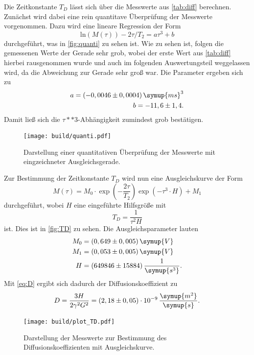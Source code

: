 Die Zeitkonstante $T_D$ lässt sich über die Messwerte aus \autoref{tab:diff} berechnen.
Zunächst wird dabei eine rein quantitave Überprüfung der Messwerte vorgenommen.
Dazu wird eine lineare Regression der Form 
\begin{equation*}
     \text{ln}(M(\tau)) - 2\tau /T_2 = a \tau^3 + b
\end{equation*}     
durchgeführt,
was in \autoref{fig:quanti} zu sehen ist.
Wie zu sehen ist, folgen die gemessenen Werte der Gerade sehr grob, wobei der erste Wert aus \autoref{tab:diff}
hierbei rausgenommen wurde und auch im folgenden Auswertungsteil weggelassen wird, da die Abweichung zur Gerade 
sehr groß war.
Die Parameter ergeben sich zu 
\begin{align*}
    a = (-0,0046 \pm 0,0004) \, \symup{ms}^3 \\
    b = -11,6 \pm 1,4.
\end{align*}
Damit ließ sich die $\tau**3$-Abhängigkeit zumindest grob bestätigen.\\
\begin{figure}
    \centering
    \texttt{[image: build/quanti.pdf]}
    \caption{Darstellung einer quantitativen Überprüfung der Messwerte mit eingzeichneter Ausgleichsgerade.}
    \label{fig:quanti}
\end{figure}
Zur Bestimmung der Zeitkonstante $T_D$ wird nun eine Ausgleichskurve der Form 
\begin{equation*}
    M(\tau) = M_0 \cdot \exp \left( - \frac{2 \tau}{T_2}  \right) \exp \left( - \tau^3 \cdot H   \right) + M_1
\end{equation*}
durchgeführt, wobei $H$ eine eingeführte Hilfsgröße mit 
\begin{equation*}
    T_D = \frac{1}{\tau^2 H}
\end{equation*}
ist. Dies ist in \autoref{fig:TD} zu sehen.
Die Ausgleichsparameter lauten
\begin{align*}
    M_0 &= (0,649 \pm 0,005) \, \symup{V} \\
    M_1 &= (0,053 \pm 0,005) \, \symup{V} \\
    H   &= (649846 \pm 15884) \, \frac{1}{\symup{s^3}}.
\end{align*}
Mit \autoref{eq:D} ergibt sich dadurch der Diffusionskoeffizient zu
\begin{equation*}
    D = \frac{3 H}{2 \gamma^2 G^2} = (2,18 \pm 0,05 ) \cdot 10^{-9} \, \frac{\symup{m^2}}{\symup{s}}.
\end{equation*}
\begin{figure}
    \centering
    \texttt{[image: build/plot\_TD.pdf]}
    \caption{Darstellung der Messwerte zur Bestimmung des Diffusionskoeffizienten mit Ausgleichskurve.}
    \label{fig:TD}
\end{figure}

